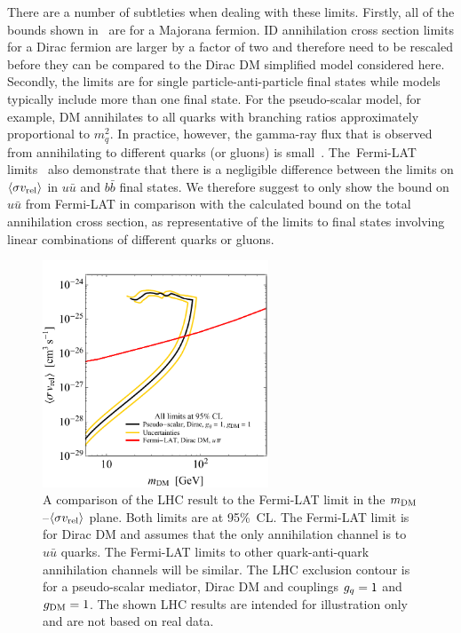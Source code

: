 There are a number of subtleties when dealing with these limits. Firstly, all of the  bounds shown in~\cite{Ackermann:2015zua} are for a Majorana fermion. ID annihilation cross section limits for a Dirac fermion are larger by a factor of two and therefore need to be rescaled before they can be compared to the Dirac DM simplified model considered here. Secondly, the limits are for single  particle-anti-particle final states while models typically include more than one final state. For the  pseudo-scalar model, for example, DM annihilates to all quarks with branching ratios approximately proportional to $m_q^2$.
In practice, however, the gamma-ray flux that is observed from annihilating to different quarks (or gluons) is small~\cite{Cirelli:2010xx}. The~Fermi-LAT limits~\cite{Ackermann:2015zua} also demonstrate that there is a negligible difference between the limits on $\langle \sigma v_{\rm{rel}} \rangle$ in $u \bar{u}$ and $b \bar{b}$ final states. We therefore suggest to only show the bound on $u\bar{u}$ from Fermi-LAT in comparison with the calculated bound on the total annihilation cross section, as representative of the limits to final states involving linear combinations of different quarks or gluons. 

\begin{figure}[t!]
	\centering
	\includegraphics[width=0.6\textwidth]{figure4}
	\caption{A comparison of the  LHC result to the Fermi-LAT limit in the $m_{\rm{DM}}$--$\langle \sigma v_{\rm{rel}} \rangle$  plane. Both limits are at 95\%~CL. The Fermi-LAT limit is for Dirac DM and assumes that the only annihilation channel is to $u \bar{u}$ quarks. The Fermi-LAT limits to other  quark-anti-quark annihilation channels will be similar. The LHC exclusion contour is for a  pseudo-scalar mediator, Dirac DM and couplings $g_q=1$ and $g_{\rm{DM}}=1$.  The shown  LHC results are intended for illustration only and are not based on real data.}
	\label{fig:ID}
\end{figure}


